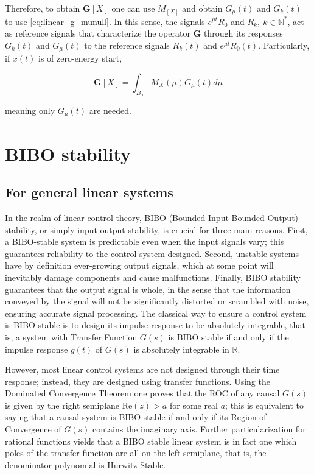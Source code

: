 	Therefore, to obtain $\mathbf{G}\left[X\right]$ one can use $M_{\left[X\right]}$ and obtain $G_\mu(t)$ and $G_k(t)$ to use \eqref{eq:linear_g_munull}. In this sense, the signals $e^{\mu  t} R_0$ and $R_k,\ k\in\mathbb{N}^*$, act as reference signals that characterize the operator $\mathbf{G}$ through its responses $G_k(t)$ and $G_\mu(t)$ to the reference signals $R_k(t)$ and $e^{\mu t}R_0(t)$. Particularly, if $x(t)$ is of zero-energy start,

\begin{equation} \mathbf{G}\left[X\right]  = \int_{B_\alpha} M_X\left(\mu\right) G_\mu (t) d\mu \end{equation}

	\noindent meaning only $G_\mu(t)$ are needed.

\section{BIBO stability}

\subsection{For general linear systems} %

	In the realm of linear control theory, BIBO (Bounded-Input-Bounded-Output) stability, or simply input-output stability, is crucial for three main reasons. First, a BIBO-stable system is predictable even when the input signals vary; this guarantees reliability to the control system designed. Second, unstable systems have by definition ever-growing output signals, which at some point will inevitably damage components and cause malfunctions. Finally, BIBO stability guarantees that the output signal is whole, in the sense that the information conveyed by the signal will not be significantly distorted or scrambled with noise, ensuring accurate signal processing.	The classical way to ensure a control system is BIBO stable is to design its impulse response to be absolutely integrable, that is, a system with Transfer Function $G(s)$ is BIBO stable if and only if the impulse response $g(t)$ of $G(s)$ is absolutely integrable in $\mathbb{R}$.

	However, most linear control systems are not designed through their time response; instead, they are designed using transfer functions. Using the Dominated Convergence Theorem one proves that the ROC of any causal $G(s)$ is given by the right semiplane $\text{Re}(z) > a$ for some real $a$; this is equivalent to saying that a causal system is BIBO stable if and only if its Region of Convergence of $G(s)$ contains the imaginary axis. Further particularization for rational functions yields that a BIBO stable linear system is in fact one which poles of the transfer function are all on the left semiplane, that is, the denominator polynomial is Hurwitz Stable.

